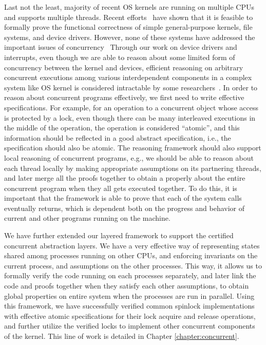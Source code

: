 Last not the least, majority of recent OS kernels are running on multiple CPUs and supports
multiple threads.   Recent
efforts~\cite{klein2009sel4,hawblitzel10,klein14,ironclad14,fscq15,cogent16}
have shown that it is feasible to formally prove the functional
correctness of simple general-purpose kernels, file systems,
and device drivers. However, none of these systems have addressed the
important issues of concurrency~\cite{kaashoek15,ospp11}
Through our work on device drivers and interrupts, even though
we are able to reason about some limited form of concurrency between the kernel and
devices, efficient reasoning on arbitrary concurrent executions among various
interdependent components in a complex system like OS kernel is considered
intractable by some researchers~\cite{vontessin13,peters15}. 
In order to reason about concurrent programs effectively, we first need to write
effective specifications. For example, for an operation to a concurrent object whose
access is protected by a lock, even though there can be many interleaved executions
in the middle of the operation, the operation is considered ``atomic'', and this
information should be reflected in a good abstract specification, i.e.,
the specification should also be atomic. The reasoning framework should also support
local reasoning of concurrent programs, e.g., we should be able to reason about
each thread locally by making appropriate assumptions on its partnering threads,
and later merge all the proofs together to obtain a properly about the entire
concurrent program when they all gets executed together. To do this, it is important
that the framework is able to prove that each of the system calls eventually returns,
which is dependent both on the progress and behavior of current and other programs
running on the machine.

We have further extended our layered framework to support the certified
concurrent abstraction layers. We have a very effective way of representing
states shared among processes running on other CPUs, and enforcing invariants on
the current process, and assumptions on the other processes. This way, it allows
us to formally verify the code running on each processes separately, and later
link the code and proofs together when they satisfy each other assumptions,
to obtain global properties on entire system when the processes are run in parallel.
Using this framework,
we have successfully verified common spinlock implementations with effective
atomic specifications for their lock acquire and release operations, and further utilize
the verified locks to implement other concurrent components of the kernel.
This line of work is detailed in Chapter \ref{chapter:concurrent}.

